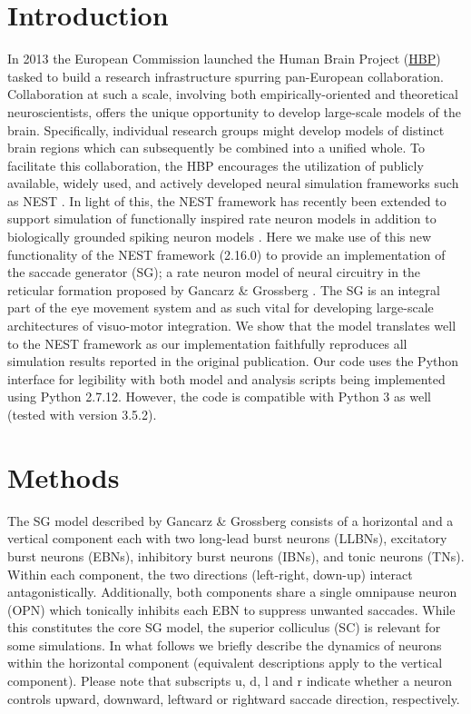 \documentclass[10pt,a4paper,onecolumn]{article}
\begin{document}
\hypertarget{introduction}{%
\section{Introduction}\label{introduction}}

In 2013 the European Commission launched the Human Brain Project
(\href{https://www.humanbrainproject.eu/en/}{HBP}) tasked to build a
research infrastructure spurring pan-European collaboration.
Collaboration at such a scale, involving both empirically-oriented and
theoretical neuroscientists, offers the unique opportunity to develop
large-scale models of the brain. Specifically, individual research
groups might develop models of distinct brain regions which can
subsequently be combined into a unified whole. To facilitate this
collaboration, the HBP encourages the utilization of publicly available,
widely used, and actively developed neural simulation frameworks such as
NEST \autocite{Gewaltig2007}. In light of this, the NEST framework has
recently been extended to support simulation of functionally inspired
rate neuron models in addition to biologically grounded spiking neuron
models \autocite{Hahne2017}. Here we make use of this new functionality
of the NEST framework (2.16.0) to provide an implementation of the
saccade generator (SG); a rate neuron model of neural circuitry in the
reticular formation proposed by Gancarz \& Grossberg
\autocite{Gancarz1998}. The SG is an integral part of the eye movement
system \autocite{Grossberg2012} and as such vital for developing
large-scale architectures of visuo-motor integration. We show that the
model translates well to the NEST framework as our implementation
faithfully reproduces all simulation results reported in the original
publication. Our code uses the Python interface \autocite{Eppler2008}
for legibility with both model and analysis scripts being implemented
using Python 2.7.12. However, the code is compatible with Python 3 as
well (tested with version 3.5.2).

\hypertarget{methods}{%
\section{Methods}\label{methods}}

The SG model described by Gancarz \& Grossberg \autocite{Gancarz1998}
consists of a horizontal and a vertical component each with two
long-lead burst neurons (LLBNs), excitatory burst neurons (EBNs),
inhibitory burst neurons (IBNs), and tonic neurons (TNs). Within each
component, the two directions (left-right, down-up) interact
antagonistically. Additionally, both components share a single omnipause
neuron (OPN) which tonically inhibits each EBN to suppress unwanted
saccades. While this constitutes the core SG model, the superior
colliculus (SC) is relevant for some simulations. In what follows we
briefly describe the dynamics of neurons within the horizontal component
(equivalent descriptions apply to the vertical component). Please note
that subscripts \(\mathrm{u}\), \(\mathrm{d}\), \(\mathrm{l}\) and
\(\mathrm{r}\) indicate whether a neuron controls upward, downward,
leftward or rightward saccade direction, respectively.
\end{document}
